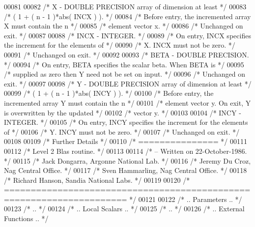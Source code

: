 \begin{DoxyCode}
00081 
00082 \textcolor{comment}{/*  X      - DOUBLE PRECISION array of dimension at least */}
00083 \textcolor{comment}{/*           ( 1 + ( n - 1 )*abs( INCX ) ). */}
00084 \textcolor{comment}{/*           Before entry, the incremented array X must contain the n */}
00085 \textcolor{comment}{/*           element vector x. */}
00086 \textcolor{comment}{/*           Unchanged on exit. */}
00087 
00088 \textcolor{comment}{/*  INCX   - INTEGER. */}
00089 \textcolor{comment}{/*           On entry, INCX specifies the increment for the elements of */}
00090 \textcolor{comment}{/*           X. INCX must not be zero. */}
00091 \textcolor{comment}{/*           Unchanged on exit. */}
00092 
00093 \textcolor{comment}{/*  BETA   - DOUBLE PRECISION. */}
00094 \textcolor{comment}{/*           On entry, BETA specifies the scalar beta. When BETA is */}
00095 \textcolor{comment}{/*           supplied as zero then Y need not be set on input. */}
00096 \textcolor{comment}{/*           Unchanged on exit. */}
00097 
00098 \textcolor{comment}{/*  Y      - DOUBLE PRECISION array of dimension at least */}
00099 \textcolor{comment}{/*           ( 1 + ( n - 1 )*abs( INCY ) ). */}
00100 \textcolor{comment}{/*           Before entry, the incremented array Y must contain the n */}
00101 \textcolor{comment}{/*           element vector y. On exit, Y is overwritten by the updated */}
00102 \textcolor{comment}{/*           vector y. */}
00103 
00104 \textcolor{comment}{/*  INCY   - INTEGER. */}
00105 \textcolor{comment}{/*           On entry, INCY specifies the increment for the elements of */}
00106 \textcolor{comment}{/*           Y. INCY must not be zero. */}
00107 \textcolor{comment}{/*           Unchanged on exit. */}
00108 
00109 \textcolor{comment}{/*  Further Details */}
00110 \textcolor{comment}{/*  =============== */}
00111 
00112 \textcolor{comment}{/*  Level 2 Blas routine. */}
00113 
00114 \textcolor{comment}{/*  -- Written on 22-October-1986. */}
00115 \textcolor{comment}{/*     Jack Dongarra, Argonne National Lab. */}
00116 \textcolor{comment}{/*     Jeremy Du Croz, Nag Central Office. */}
00117 \textcolor{comment}{/*     Sven Hammarling, Nag Central Office. */}
00118 \textcolor{comment}{/*     Richard Hanson, Sandia National Labs. */}
00119 
00120 \textcolor{comment}{/*  ===================================================================== */}
00121 
00122 \textcolor{comment}{/*     .. Parameters .. */}
00123 \textcolor{comment}{/*     .. */}
00124 \textcolor{comment}{/*     .. Local Scalars .. */}
00125 \textcolor{comment}{/*     .. */}
00126 \textcolor{comment}{/*     .. External Functions .. */}

\end{DoxyCode}

